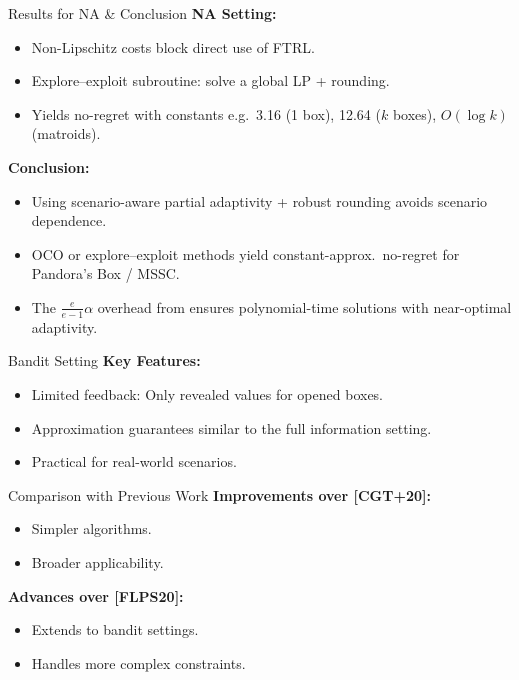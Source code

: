 \documentclass{beamer}
\begin{document}
    \begin{frame}{Results for NA \& Conclusion}
    \textbf{NA Setting:}
    \begin{itemize}
        \item Non-Lipschitz costs block direct use of FTRL.
        \item Explore--exploit subroutine: solve a global LP + rounding.
        \item Yields no-regret with constants e.g.\ 3.16 (1 box), 12.64 ($k$ boxes), $O(\log k)$ (matroids).
    \end{itemize}
    
    \textbf{Conclusion:}
    \begin{itemize}
        \item Using scenario-aware partial adaptivity + robust rounding avoids scenario dependence.
        \item OCO or explore--exploit methods yield constant-approx.\ no-regret for Pandora’s Box / MSSC.
        \item The $\frac{e}{e-1}\alpha$ overhead from \cite{CGT+20} ensures polynomial-time solutions with near-optimal adaptivity.
    \end{itemize}

\begin{frame}{Bandit Setting}
\textbf{Key Features:}
\begin{itemize}
    \item Limited feedback: Only revealed values for opened boxes.
    \item Approximation guarantees similar to the full information setting.
    \item Practical for real-world scenarios.
\end{itemize}
\end{frame}

\begin{frame}{Comparison with Previous Work}
\textbf{Improvements over [CGT+20]:}
\begin{itemize}
    \item Simpler algorithms.
    \item Broader applicability.
\end{itemize}
\textbf{Advances over [FLPS20]:}
\begin{itemize}
    \item Extends to bandit settings.
    \item Handles more complex constraints.
\end{itemize}
\end{frame}


\end{frame}
\end{document}
